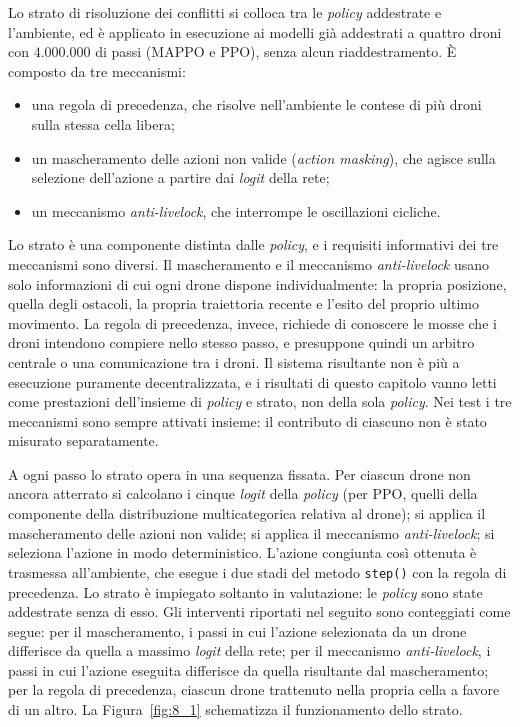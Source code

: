 \documentclass[12pt,a4paper,twoside]{report}
\begin{document}
Lo strato di risoluzione dei conflitti si colloca tra le \emph{policy} addestrate e l'ambiente, ed è applicato in esecuzione ai modelli già addestrati a quattro droni con $4.000.000$ di passi (MAPPO e PPO), senza alcun riaddestramento. È composto da tre meccanismi:
\begin{itemize}
    \item una regola di precedenza, che risolve nell'ambiente le contese di più droni sulla stessa cella libera;
    \item un mascheramento delle azioni non valide (\emph{action masking}), che agisce sulla selezione dell'azione a partire dai \emph{logit} della rete;
    \item un meccanismo \emph{anti-livelock}, che interrompe le oscillazioni cicliche.
\end{itemize}

Lo strato è una componente distinta dalle \emph{policy}, e i requisiti informativi dei tre meccanismi sono diversi. Il mascheramento e il meccanismo \emph{anti-livelock} usano solo informazioni di cui ogni drone dispone individualmente: la propria posizione, quella degli ostacoli, la propria traiettoria recente e l'esito del proprio ultimo movimento. La regola di precedenza, invece, richiede di conoscere le mosse che i droni intendono compiere nello stesso passo, e presuppone quindi un arbitro centrale o una comunicazione tra i droni. Il sistema risultante non è più a esecuzione puramente decentralizzata, e i risultati di questo capitolo vanno letti come prestazioni dell'insieme di \emph{policy} e strato, non della sola \emph{policy}. Nei test i tre meccanismi sono sempre attivati insieme: il contributo di ciascuno non è stato misurato separatamente.

A ogni passo lo strato opera in una sequenza fissata. Per ciascun drone non ancora atterrato si calcolano i cinque \emph{logit} della \emph{policy} (per PPO, quelli della componente della distribuzione multicategorica relativa al drone); si applica il mascheramento delle azioni non valide; si applica il meccanismo \emph{anti-livelock}; si seleziona l'azione in modo deterministico. L'azione congiunta così ottenuta è trasmessa all'ambiente, che esegue i due stadi del metodo \texttt{step()} con la regola di precedenza. Lo strato è impiegato soltanto in valutazione: le \emph{policy} sono state addestrate senza di esso. Gli interventi riportati nel seguito sono conteggiati come segue: per il mascheramento, i passi in cui l'azione selezionata da un drone differisce da quella a massimo \emph{logit} della rete; per il meccanismo \emph{anti-livelock}, i passi in cui l'azione eseguita differisce da quella risultante dal mascheramento; per la regola di precedenza, ciascun drone trattenuto nella propria cella a favore di un altro. La Figura~\ref{fig:8_1} schematizza il funzionamento dello strato.
\end{document}
